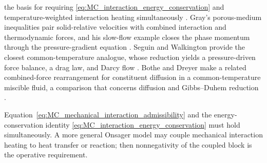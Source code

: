 the basis for requiring \eqref{eq:MC_interaction_energy_conservation} and
temperature-weighted interaction heating simultaneously
\cite[eq.~(4.8)]{drumheller1980thermomechanical}.  Gray's porous-medium
inequalities pair solid-relative velocities with combined interaction and
thermodynamic forces, and his slow-flow example closes the phase momentum
through the pressure-gradient equation
\cite[eqs.~(33), (37), (44), (47), and (77)]{gray1999thermodynamics}.  Seguin
and Walkington provide the closest common-temperature analogue, whose
reduction yields a pressure-driven force balance, a drag law, and Darcy flow
\cite[eqs.~(15), (32), (33), (35), (37), (40), and (41)]{seguin2019multicomponent}.
Bothe and Dreyer make a related combined-force rearrangement for constituent
diffusion in a common-temperature miscible fluid, a comparison that concerns
diffusion and Gibbs--Duhem reduction
\cite[eqs.~(88)--(93)]{bothe2015continuum}.

Equation~\eqref{eq:MC_mechanical_interaction_admissibility} and the
energy-conservation identity \eqref{eq:MC_interaction_energy_conservation} must
hold simultaneously.  A more general Onsager model may couple mechanical
interaction heating to heat transfer or reaction; then nonnegativity of the
coupled block is the operative requirement.

